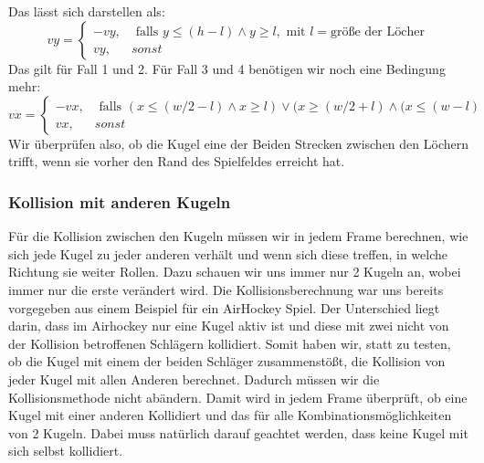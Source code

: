 		Das lässt sich darstellen als: 
		\begin{equation}
		vy = \begin{cases}
			-vy, & \text{ falls } y \leq (h- l) \land y \geq l, \text{ mit } l = \text{größe der Löcher} \\
			vy, & sonst 
		\end{cases}
		\end{equation}
		Das gilt für Fall 1 und 2. Für Fall 3 und 4 benötigen wir noch eine Bedingung mehr:
		 \begin{equation}
		vx = \begin{cases}
		-vx, & \text{ falls } (x \leq (w/2 - l) \land x \geq l) \lor (x \geq (w/2 + l) \land (x \leq (w- l) \\
		vx, & sonst 
		\end{cases}
		\end{equation}
		Wir überprüfen also, ob die Kugel eine der Beiden Strecken zwischen den Löchern trifft, wenn sie vorher den Rand des Spielfeldes erreicht hat. 
	\subsubsection{Kollision mit anderen Kugeln}
		Für die Kollision zwischen den Kugeln müssen wir in jedem Frame berechnen, wie sich jede Kugel zu jeder anderen verhält und wenn sich diese treffen, in welche Richtung sie weiter Rollen. Dazu schauen wir uns immer nur 2 Kugeln an, wobei immer nur die erste verändert wird. 
		Die Kollisionsberechnung war uns bereits vorgegeben aus einem Beispiel für ein AirHockey Spiel. 
		Der Unterschied liegt darin, dass im Airhockey nur eine Kugel aktiv ist und diese mit zwei nicht von der Kollision betroffenen Schlägern kollidiert. 
		Somit haben wir, statt zu testen, ob die Kugel mit einem der beiden Schläger zusammenstößt, die Kollision von jeder Kugel mit allen Anderen berechnet. Dadurch müssen wir die Kollisionsmethode nicht abändern.
		Damit wird in jedem Frame überprüft, ob eine Kugel mit einer anderen Kollidiert und das für alle Kombinationsmöglichkeiten von 2 Kugeln. 
		Dabei muss natürlich darauf geachtet werden, dass keine Kugel mit sich selbst kollidiert. \\
		
